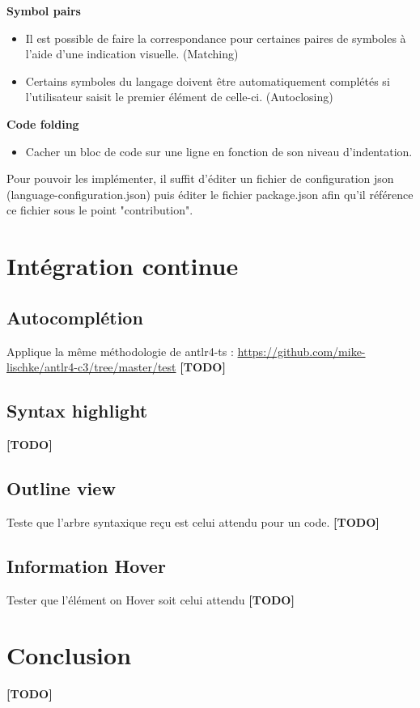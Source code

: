 \documentclass[
    iict, %
    il, %
]{heig-tb}
\begin{document}
\textbf{Symbol pairs}
\begin{itemize}
    \item Il est possible de faire la correspondance pour certaines paires de symboles à l'aide d'une indication visuelle. (Matching)
    \item Certains symboles du langage doivent être automatiquement complétés si l'utilisateur saisit le premier élément de celle-ci. (Autoclosing)
\end{itemize}

\textbf{Code folding}
\begin{itemize}
    \item Cacher un bloc de code sur une ligne en fonction de son niveau d'indentation.
\end{itemize}

Pour pouvoir les implémenter, il suffit d'éditer un fichier de configuration json (language-configuration.json) puis  éditer le fichier package.json afin qu'il référence ce fichier sous le point "contribution".

\chapter{Intégration continue}

\section{Autocomplétion}
Applique la même méthodologie de antlr4-ts : \href{https://github.com/mike-lischke/antlr4-c3/tree/master/test}{https://github.com/mike-lischke/antlr4-c3/tree/master/test}
\textbf{[TODO]}

\section{Syntax highlight}
\textbf{[TODO]}

\section{Outline view}
Teste que l'arbre syntaxique reçu est celui attendu pour un code.
\textbf{[TODO]}

\section{Information Hover}
Tester que l'élément on Hover soit celui attendu
\textbf{[TODO]}

\chapter{Conclusion}
\textbf{[TODO]}
\end{document}
